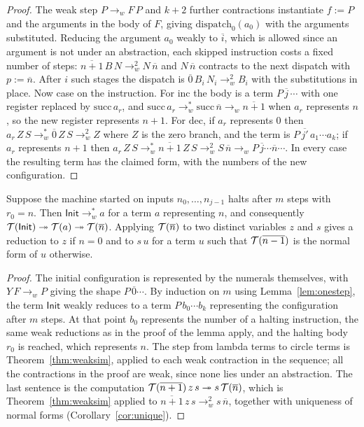 \begin{proof}
The weak step $P\to_w F\,P$ and $k+2$ further contractions instantiate $f:=P$ and the arguments in the body of $F$, giving $\mathrm{dispatch}_0(a_0)$ with the arguments substituted. Reducing the argument $a_0$ weakly to $\overline{i}$, which is allowed since an argument is not under an abstraction, each skipped instruction costs a fixed number of steps: $\overline{n+1}\,B\,N\to_w^2 N\,\overline{n}$ and $N\,\overline{n}$ contracts to the next dispatch with $p:=\overline{n}$. After $i$ such stages the dispatch is $\overline{0}\,B_i\,N_i\to_w^2 B_i$ with the substitutions in place. Now case on the instruction. For $\mathrm{inc}$ the body is a term $P\,\overline{j}\,\cdots$ with one register replaced by $\mathrm{succ}\,a_r$, and $\mathrm{succ}\,a_r\to_w^*\mathrm{succ}\,\overline{n}\to_w\overline{n+1}$ when $a_r$ represents $n$, so the new register represents $n+1$. For $\mathrm{dec}$, if $a_r$ represents $0$ then $a_r\,Z\,S\to_w^*\overline{0}\,Z\,S\to_w^2 Z$ where $Z$ is the zero branch, and the term is $P\,\overline{j'}\,a_1\cdots a_k$; if $a_r$ represents $n+1$ then $a_r\,Z\,S\to_w^*\overline{n+1}\,Z\,S\to_w^2 S\,\overline{n}\to_w P\,\overline{j}\cdots\overline{n}\cdots$. In every case the resulting term has the claimed form, with the numbers of the new configuration.
\end{proof}

\begin{theorem}\label{thm:halting}
Suppose the machine started on inputs $n_0,\dots,n_{j-1}$ halts after $m$ steps with $r_0=n$. Then $\mathsf{Init}\to_w^*a$ for a term $a$ representing $n$, and consequently $\mathcal{T}(\mathsf{Init})\twoheadrightarrow\mathcal{T}(a)\twoheadrightarrow\mathcal{T}(\overline{n})$. Applying $\mathcal{T}(\overline{n})$ to two distinct variables $z$ and $s$ gives a reduction to $z$ if $n=0$ and to $s\,u$ for a term $u$ such that $\mathcal{T}(\overline{n-1})$ is the normal form of $u$ otherwise.
\end{theorem}

\begin{proof}
The initial configuration is represented by the numerals themselves, with $Y\,F\to_w P$ giving the shape $P\,\overline{0}\cdots$. By induction on $m$ using Lemma~\ref{lem:onestep}, the term $\mathsf{Init}$ weakly reduces to a term $P\,b_0\cdots b_k$ representing the configuration after $m$ steps. At that point $b_0$ represents the number of a halting instruction, the same weak reductions as in the proof of the lemma apply, and the halting body $r_0$ is reached, which represents $n$. The step from lambda terms to circle terms is Theorem~\ref{thm:weaksim}, applied to each weak contraction in the sequence; all the contractions in the proof are weak, since none lies under an abstraction. The last sentence is the computation $\mathcal{T}(\overline{n+1})\,z\,s\twoheadrightarrow s\,\mathcal{T}(\overline{n})$, which is Theorem~\ref{thm:weaksim} applied to $\overline{n+1}\,z\,s\to_w^2 s\,\overline{n}$, together with uniqueness of normal forms (Corollary~\ref{cor:unique}).
\end{proof}

